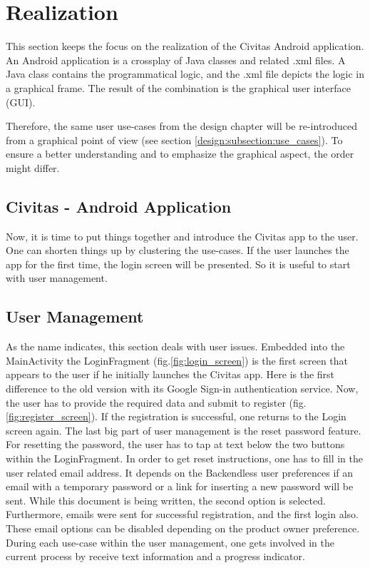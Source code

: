 \newpage
\chapter{Realization}
\label{cap:Realization}
This section keeps the focus on the realization of the Civitas Android application.  
An Android application is a crossplay of Java classes and related .xml files. A Java class contains the programmatical logic, and the .xml file depicts the logic in a graphical frame. The result of the combination is the graphical user interface (GUI).

Therefore, the same user use-cases from the design chapter will be re-introduced from a graphical point of view (see section \ref{design:subsection:use_cases}). To ensure a better understanding and to emphasize the graphical aspect, the order might differ.


\section{Civitas - Android Application}

Now, it is time to put things together and introduce the Civitas app to the user. One can shorten things up by clustering the use-cases. If the user launches the app for the first time, the login screen will be presented. So it is useful to start with user management.

\section{User Management}
As the name indicates, this section deals with user issues. Embedded into the MainActivity the LoginFragment (fig.\ref{fig:login_screen}) is the first screen that appears to the user if he initially launches the Civitas app. Here is the first difference to the old version with its Google Sign-in authentication service. Now, the user has to provide the required data and submit to register (fig. \ref{fig:register_screen}). If the registration is successful, one returns to the Login screen again. 
The last big part of user management is the reset password feature. For resetting the password, the user has to tap at text below the two buttons within the LoginFragment. In order to get reset instructions, one has to fill in the user related email address. It depends on the Backendless user preferences if an email with a temporary password or a link for inserting a new password will be sent. While this document is being written, the second option is selected.
Furthermore, emails were sent for successful registration, and the first login also. These email options can be disabled depending on the product owner preference. During each use-case within the user management, one gets involved in the current process by receive text information and a progress indicator. 

